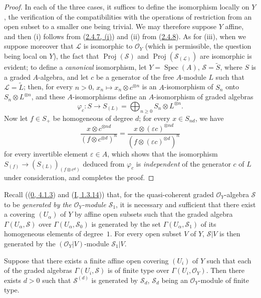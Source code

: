 \begin{proof}
In each of the three cases, it suffices to define the isomorphism locally on
$Y$, the verification of the compatibilities with the operations of
restriction from an open subset to a smaller one being trivial. We may
therefore suppose $Y$ affine, and then (i) follows from
(\hyperref[II.2.4.7]{2.4.7, (i)}) and (ii) from
(\hyperref[II.2.4.8]{2.4.8}). As for (iii), when we suppose moreover that
$\mathcal{L}$ is isomorphic to $\mathcal{O}_Y$ (which is permissible, the
question being local on $Y$), the fact that
$\operatorname{Proj}(\mathcal{S})$ and
$\operatorname{Proj}(\mathcal{S}_{(\mathcal{L})})$ are isomorphic is evident;
to define a \emph{canonical} isomorphism, let
$Y=\operatorname{Spec}(A)$, $\mathcal{S}=\widetilde{S}$, where $S$ is a
graded $A$-algebra, and let $c$ be a generator of the free $A$-module $L$
such that $\mathcal{L}=\widetilde{L}$; then, for every $n>0$,
$x_n\mapsto x_n\otimes c^{\otimes n}$ is an $A$-isomorphism of $S_n$ onto
$S_n\otimes L^{\otimes n}$, and these $A$-isomorphisms define an
$A$-isomorphism of graded algebras
\[
  \varphi_c:S\longrightarrow S_{(L)}
  =\bigoplus_{n\geq0}S_n\otimes L^{\otimes n}.
\]
Now let $f\in S_+$ be homogeneous of degree $d$; for every $x\in S_{nd}$, we
have
\[
  \frac{x\otimes c^{\otimes nd}}{(f\otimes c^{\otimes d})^n}
  =\frac{x\otimes(\varepsilon c)^{\otimes nd}}
  {(f\otimes(\varepsilon c)^{\otimes d})^n}
\]
for every invertible element $\varepsilon\in A$, which shows that the
isomorphism $S_{(f)}\to(S_{(L)})_{(f\otimes c^d)}$ deduced from $\varphi_c$
is \emph{independent} of the generator $c$ of $L$ under consideration, and
completes the proof.
\end{proof}

\begin{env}[3.1.9]
\label{II.3.1.9}
Recall ((\hyperref[0.4.1.3]{0, 4.1.3}) and
(\hyperref[I.1.3.14]{I, 1.3.14})) that, for the quasi-coherent graded
$\mathcal{O}_Y$-algebra $\mathcal{S}$ to be \emph{generated by the
$\mathcal{O}_Y$-module $\mathcal{S}_1$}, it is necessary and sufficient that
there exist a covering $(U_\alpha)$ of $Y$ by affine open subsets such that
the graded algebra $\Gamma(U_\alpha,\mathcal{S})$ over
$\Gamma(U_\alpha,\mathcal{S}_0)$ is generated by the set
$\Gamma(U_\alpha,\mathcal{S}_1)$ of its homogeneous elements of degree~$1$.
For every open subset $V$ of $Y$, $\mathcal{S}|V$ is then generated by the
$(\mathcal{O}_Y|V)$-module $\mathcal{S}_1|V$.
\end{env}

\begin{proposition}[3.1.10]
\label{II.3.1.10}
Suppose that there exists a finite affine open covering $(U_i)$ of $Y$ such
that each of the graded algebras $\Gamma(U_i,\mathcal{S})$ is of finite type
over $\Gamma(U_i,\mathcal{O}_Y)$. Then there exists $d>0$ such that
$\mathcal{S}^{(d)}$ is generated by $\mathcal{S}_d$, $\mathcal{S}_d$ being
an $\mathcal{O}_Y$-module of finite type.
\end{proposition}

